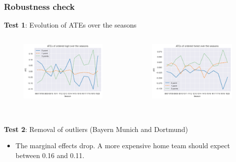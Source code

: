 \documentclass{beamer}
\begin{document}
\begin{frame}
\frametitle{Robustness check}

\textbf{Test 1}: Evolution of ATEs over the seasons

\begin{columns}
  \begin{column}{0.5\textwidth}
    \begin{figure}
      \includegraphics[width=1\textwidth]{img/ATEs_logit.png}
    \end{figure}
   \end{column}

   \begin{column}{0.5\textwidth}
    \begin{figure}
      \includegraphics[width=1\textwidth]{img/ATEs_orf.png}
    \end{figure}
  \end{column}
\end{columns}
\
\\
\textbf{Test 2}: Removal of outliers (Bayern Munich and Dortmund)
\begin{itemize}
\item The marginal effects drop. A more expensive home team should expect between 0.16 and 0.11.
\end{itemize}

\end{frame}
\end{document}

